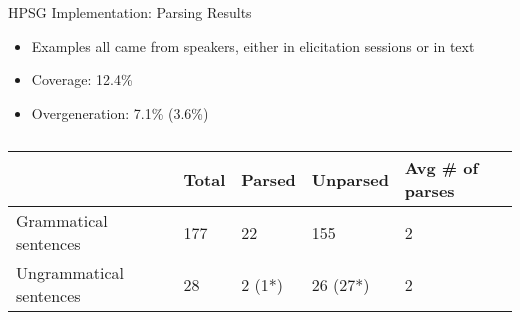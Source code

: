 \begin{frame}{HPSG Implementation: Parsing Results}

\begin{itemize}
\item Examples all came from speakers, either in elicitation sessions or in text
\item Coverage: 12.4\%
\item Overgeneration: 7.1\% (3.6\%)
\end{itemize}

\begin{table}[]
\centering
\caption{}
\label{tab:my-table}
\begin{tabular}{l|llll}
 & Total & Parsed & Unparsed & Avg \# of parses \\ \hline
Grammatical sentences & 177 & 22 & 155 & 2 \\ \hline
Ungrammatical sentences & 28 & 2 (1*) & 26 (27*) & 2
\end{tabular}
\end{table}
	
\end{frame}
